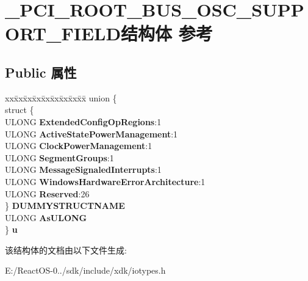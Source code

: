 \hypertarget{struct___p_c_i___r_o_o_t___b_u_s___o_s_c___s_u_p_p_o_r_t___f_i_e_l_d}{}\section{\+\_\+\+P\+C\+I\+\_\+\+R\+O\+O\+T\+\_\+\+B\+U\+S\+\_\+\+O\+S\+C\+\_\+\+S\+U\+P\+P\+O\+R\+T\+\_\+\+F\+I\+E\+L\+D结构体 参考}
\label{struct___p_c_i___r_o_o_t___b_u_s___o_s_c___s_u_p_p_o_r_t___f_i_e_l_d}
\subsection*{Public 属性}
\begin{DoxyCompactItemize}
\item 
\mbox{\label{struct___p_c_i___r_o_o_t___b_u_s___o_s_c___s_u_p_p_o_r_t___f_i_e_l_d_ac1d271c2aa4f872c85c22947ba39305c}} 
\begin{tabbing}
xx\=xx\=xx\=xx\=xx\=xx\=xx\=xx\=xx\=\kill
union \{\\
\>struct \{\\
\>\>ULONG {\bfseries ExtendedConfigOpRegions}:1\\
\>\>ULONG {\bfseries ActiveStatePowerManagement}:1\\
\>\>ULONG {\bfseries ClockPowerManagement}:1\\
\>\>ULONG {\bfseries SegmentGroups}:1\\
\>\>ULONG {\bfseries MessageSignaledInterrupts}:1\\
\>\>ULONG {\bfseries WindowsHardwareErrorArchitecture}:1\\
\>\>ULONG {\bfseries Reserved}:26\\
\>\} {\bfseries DUMMYSTRUCTNAME}\\
\>ULONG {\bfseries AsULONG}\\
\} {\bfseries u}\\

\end{tabbing}\end{DoxyCompactItemize}


该结构体的文档由以下文件生成\+:\begin{DoxyCompactItemize}
\item 
E\+:/\+React\+O\+S-\/0../sdk/include/xdk/iotypes.\+h\end{DoxyCompactItemize}

